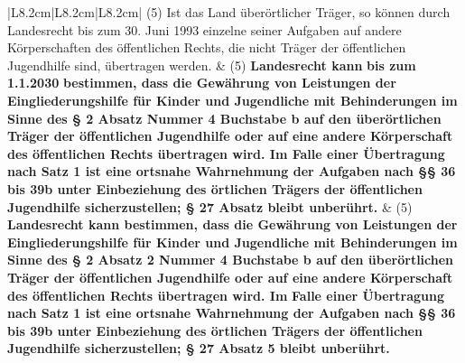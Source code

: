 \documentclass[10pt,a4paper,landscape]{article}
\begin{document}
\begin{longtable}{|L{8.2cm}|L{8.2cm}|L{8.2cm}|}
(5) \textcolor{diffred}{Ist das Land überörtlicher Träger, so  \newline können durch} Landesrecht \textcolor{diffred}{bis zum 30.  \newline Juni 1993 einzelne seiner Aufgaben} auf  \newline \textcolor{diffred}{andere Körperschaften des öffentlichen  \newline Rechts, die nicht} Träger der öffentlichen  \newline Jugendhilfe \textcolor{diffred}{sind,} übertragen \textcolor{diffred}{werden.} & (5) \textbf{Landesrecht kann }\textbf{\textcolor{diffred}{bis zum 1.1.2030}}\textbf{  \newline bestimmen, dass die Gewährung von  \newline Leistungen der Eingliederungshilfe für  \newline Kinder und Jugendliche mit  \newline Behinderungen im Sinne des \S{} 2 Absatz   Nummer 4 Buchstabe b auf den  \newline überörtlichen Träger der öffentlichen  \newline Jugendhilfe oder auf eine andere  \newline Körperschaft des öffentlichen Rechts  \newline übertragen wird. Im Falle einer  \newline Übertragung nach Satz 1 ist eine  \newline ortsnahe Wahrnehmung der Aufgaben  \newline nach \S{}\S{} 36 bis 39b unter Einbeziehung  \newline des örtlichen Trägers der öffentlichen  \newline Jugendhilfe sicherzustellen; \S{} 27 Absatz   bleibt unberührt.} & (5) \textbf{Landesrecht kann bestimmen, dass  \newline die Gewährung von Leistungen der  \newline Eingliederungshilfe für Kinder und  \newline Jugendliche mit Behinderungen im  \newline Sinne des \S{} 2 Absatz 2 Nummer 4  \newline Buchstabe b auf den überörtlichen  \newline Träger der öffentlichen Jugendhilfe oder  \newline auf eine andere Körperschaft des  \newline öffentlichen Rechts übertragen wird. Im } \textbf{Falle einer Übertragung nach Satz 1 ist  \newline eine ortsnahe Wahrnehmung der  \newline Aufgaben nach \S{}\S{} 36 bis 39b unter  \newline Einbeziehung des örtlichen Trägers der  \newline öffentlichen Jugendhilfe  \newline sicherzustellen; \S{} 27 Absatz 5 bleibt  \newline unberührt.} \\

\end{longtable}
\end{document}

